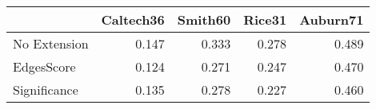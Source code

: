 \begin{tabular}{lrrrr}
\toprule
{} & Caltech36 & Smith60 & Rice31 & Auburn71 \\
\midrule
No Extension &     0.147 &   0.333 &  0.278 &    0.489 \\
EdgesScore   &     0.124 &   0.271 &  0.247 &    0.470 \\
Significance &     0.135 &   0.278 &  0.227 &    0.460 \\
\bottomrule
\end{tabular}
